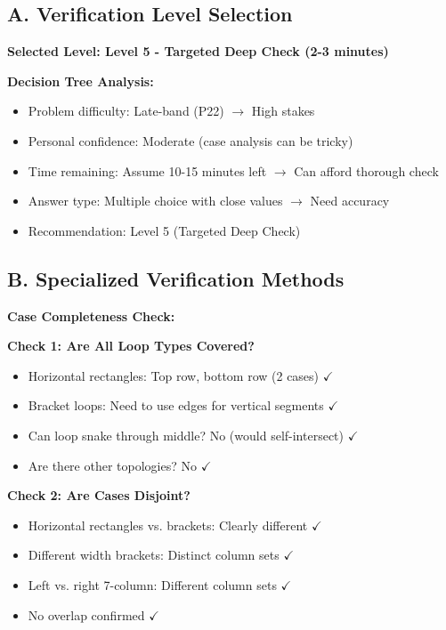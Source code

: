 \documentclass[12pt]{article}
\begin{document}
\begin{verificationbox}

\subsection*{A. Verification Level Selection}

\textbf{Selected Level: Level 5 - Targeted Deep Check (2-3 minutes)}

\textbf{Decision Tree Analysis:}
\begin{itemize}
    \item Problem difficulty: Late-band (P22) $\to$ High stakes
    \item Personal confidence: Moderate (case analysis can be tricky)
    \item Time remaining: Assume 10-15 minutes left $\to$ Can afford thorough check
    \item Answer type: Multiple choice with close values $\to$ Need accuracy
    \item Recommendation: Level 5 (Targeted Deep Check)
\end{itemize}

\subsection*{B. Specialized Verification Methods}

\textbf{Case Completeness Check:}

\textbf{Check 1: Are All Loop Types Covered?}
\begin{itemize}
    \item Horizontal rectangles: Top row, bottom row (2 cases) $\checkmark$
    \item Bracket loops: Need to use edges for vertical segments $\checkmark$
    \item Can loop snake through middle? No (would self-intersect) $\checkmark$
    \item Are there other topologies? No $\checkmark$
\end{itemize}

\textbf{Check 2: Are Cases Disjoint?}
\begin{itemize}
    \item Horizontal rectangles vs. brackets: Clearly different $\checkmark$
    \item Different width brackets: Distinct column sets $\checkmark$
    \item Left vs. right 7-column: Different column sets $\checkmark$
    \item No overlap confirmed $\checkmark$
\end{itemize}


\end{verificationbox}
\end{document}
